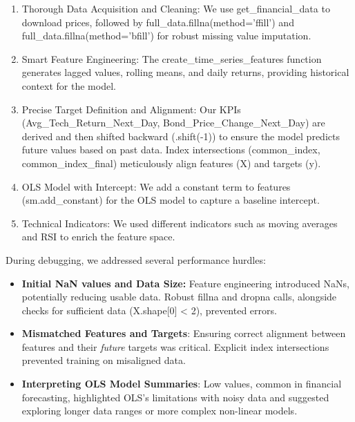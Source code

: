 \documentclass[conference]{IEEEtran}
\begin{document}
\begin{enumerate}
    \item Thorough Data Acquisition and Cleaning: We use get\_financial\_data to download prices, followed by full\_data.fillna(method='ffill') and full\_data.fillna(method='bfill') for robust missing value imputation.
    \item Smart Feature Engineering: The create\_time\_series\_features function generates lagged values, rolling means, and daily returns, providing historical context for the model.
    \item Precise Target Definition and Alignment: Our KPIs (Avg\_Tech\_Return\_Next\_Day, Bond\_Price\_Change\_Next\_Day) are derived and then shifted backward (.shift(-1)) to ensure the model predicts future values based on past data. Index intersections (common\_index, common\_index\_final) meticulously align features (X) and targets (y).
    \item OLS Model with Intercept: We add a constant term to features (sm.add\_constant) for the OLS model to capture a baseline intercept.
    \item Technical Indicators: We used different indicators such as moving averages and RSI to enrich the feature space. 
\end{enumerate}

During debugging, we addressed several performance hurdles:

\begin{itemize}
    \item \textbf{Initial NaN values and Data Size:} Feature engineering introduced NaNs, potentially reducing usable data. Robust fillna and dropna calls, alongside checks for sufficient data (X.shape[0] < 2), prevented errors.
    \item \textbf{Mismatched Features and Targets}: Ensuring correct alignment between features and their \textit{future} targets was critical. Explicit index intersections prevented training on misaligned data.
    \item \textbf{Interpreting OLS Model Summaries}: Low values, common in financial forecasting, highlighted OLS's limitations with noisy data and suggested exploring longer data ranges or more complex non-linear models.
\end{itemize}
\end{document}
